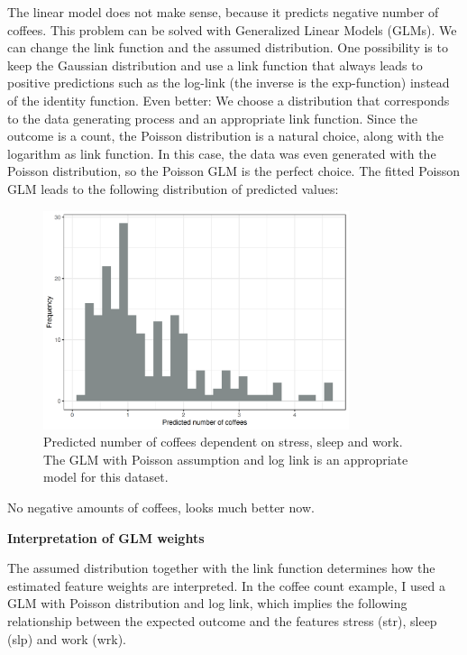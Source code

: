 \documentclass[
  10pt,
]{scrbook}
\begin{document}
The linear model does not make sense, because it predicts negative number of coffees.
This problem can be solved with Generalized Linear Models (GLMs).
We can change the link function and the assumed distribution.
One possibility is to keep the Gaussian distribution and use a link function that always leads to positive predictions such as the log-link (the inverse is the exp-function) instead of the identity function.
Even better:
We choose a distribution that corresponds to the data generating process and an appropriate link function.
Since the outcome is a count, the Poisson distribution is a natural choice, along with the logarithm as link function.
In this case, the data was even generated with the Poisson distribution, so the Poisson GLM is the perfect choice.
The fitted Poisson GLM leads to the following distribution of predicted values:

\begin{figure}

{\centering \includegraphics[width=0.8\textwidth]{images/linear-model-positive-1} 

}

\caption{Predicted number of coffees dependent on stress, sleep and work. The GLM with Poisson assumption and log link is an appropriate model for this dataset.}\label{fig:linear-model-positive}
\end{figure}

No negative amounts of coffees, looks much better now.

\textbf{Interpretation of GLM weights}

The assumed distribution together with the link function determines how the estimated feature weights are interpreted.
In the coffee count example, I used a GLM with Poisson distribution and log link, which implies the following relationship between the expected outcome and the features stress (str), sleep (slp) and work (wrk).
\end{document}
